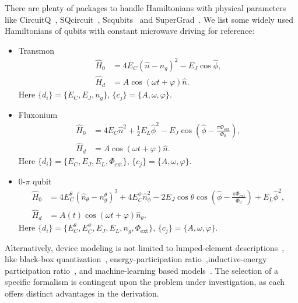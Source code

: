 \documentclass[a4paper,onecolumn,11pt,unpublished]{quantumarticle}
\newcommand{\setelem}[1]{\ensuremath{\{#1\}}}
\newcommand{\Phiext}{\Phi_{\mathrm{ext}}}
\begin{document}
There are plenty of packages to handle Hamiltonians with physical parameters like CircuitQ~\cite{Aumann2022CircuitQ}, SQcircuit~\cite{Rajabzadeh2023Analysis}, Scqubits~\cite{Groszkowski2021Scqubits} and SuperGrad~\cite{Wang2025SuperGrad}. We list some widely used Hamiltonians of qubits with constant microwave driving for reference:
\begin{itemize}
  \item Transmon~\cite{Koch2007Chargeinsensitive}
        \begin{align}
          \hat{H}_0 & = 4E_C(\hat{n}-n_g)^2-E_J\cos\hat{\phi}, \label{eq:ham_transmon}  \\
          \hat{H}_d & = A\cos(\omega t + \varphi)\hat{n}. \label{eq:ham_transmon_drive}
        \end{align}
        Here $\setelem{d_i}=\setelem{E_C,E_J,n_g}$, $\setelem{c_j}=\setelem{A, \omega, \varphi}$.
  \item Fluxonium~\cite{Manucharyan2009Fluxonium,Nguyen2019HighCoherence}
        \begin{align}
          \hat{H}_0 & = 4E_C\hat{n}^2 + \frac{1}{2}E_L\hat{\phi}^2-E_J\cos\left(\hat{\phi}-\frac{\pi\Phiext}{\Phi_0}\right), \label{eq:ham_fluxonium} \\
          \hat{H}_d & = A\cos(\omega t + \varphi)\hat{n}. \label{eq:ham_fluxonium_drive}
        \end{align}
        Here $\setelem{d_i}=\setelem{E_C,E_J,E_L,\Phiext}$, $\setelem{c_j}=\setelem{A, \omega, \varphi}$.
  \item 0-$\pi$ qubit~\cite{Gyenis2021Experimental,Gyenis2021Moving}
        \begin{align}
          \hat{H}_0 & = 4E_C^{\theta}(\hat{n}_{\theta}-n_g^{\theta})^2 + 4E_C^{\phi}\hat{n}_{\phi}^2 - 2E_J\cos\theta\cos\left(\hat{\phi}-\frac{\pi\Phiext}{\Phi_0}\right)+E_L\hat{\phi}^2, \label{eq:ham_0pi} \\
          \hat{H}_d & = A(t)\cos(\omega t + \varphi)\hat{n}_{\theta}. \label{eq:ham_0pi_drive}
        \end{align}
        Here $\setelem{d_i}=\setelem{E_C^{\theta},E_C^{\phi},E_J,E_L,n_g,\Phiext}$, $\setelem{c_j}=\setelem{A, \omega, \varphi}$.
\end{itemize}
Alternatively, device modeling is not limited to lumped-element descriptions~\cite{Ganjam2023Improving}, like black-box quantization~\cite{Nigg2012BlackBox}, energy-participation ratio~\cite{Minev2021Energyparticipation},inductive-energy participation ratio~\cite{Yu2024Using}, and machine-learning based models~\cite{Genois2021QuantumTailored,Hangleiter2024Robustly,An2025DualCapability}. The selection of a specific formalism is contingent upon the problem under investigation, as each offers distinct advantages in the derivation.
\end{document}

